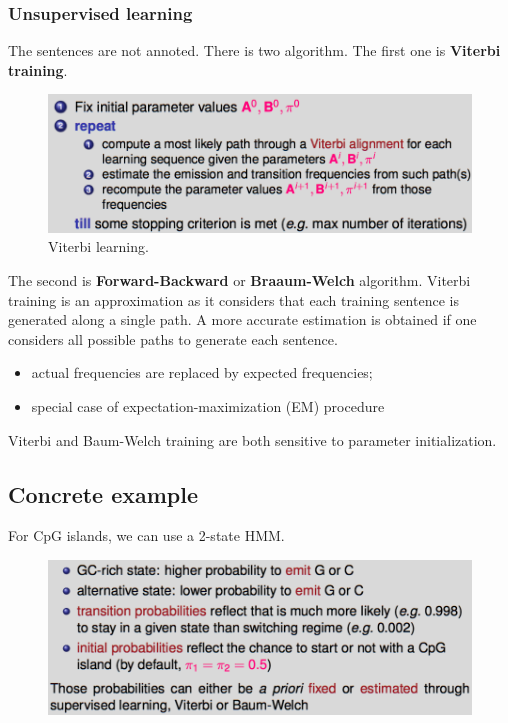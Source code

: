 \subsubsection{Unsupervised learning}

The sentences are not annoted. There is two algorithm. The first one is \textbf{Viterbi training}.

\begin{figure}[htp]
	\centering
	\includegraphics[scale=0.5]{images/30_viterbi.png}
 	\caption{Viterbi learning.}
\end{figure}

The second is \textbf{Forward-Backward} or \textbf{Braaum-Welch} algorithm. Viterbi training is an approximation as it considers that each training sentence is generated along a single path. A more accurate estimation is obtained if one considers all possible paths to generate each sentence.

\begin{itemize}
	\item actual frequencies are replaced by expected frequencies;
	\item   special case of expectation-maximization (EM) procedure
\end{itemize}

Viterbi and Baum-Welch training are both sensitive to parameter initialization.

\subsection{Concrete example}

For CpG islands, we can use a 2-state HMM.

\begin{figure}[htp]
	\centering
	\includegraphics[scale=0.5]{images/31_islands.png}
\end{figure}